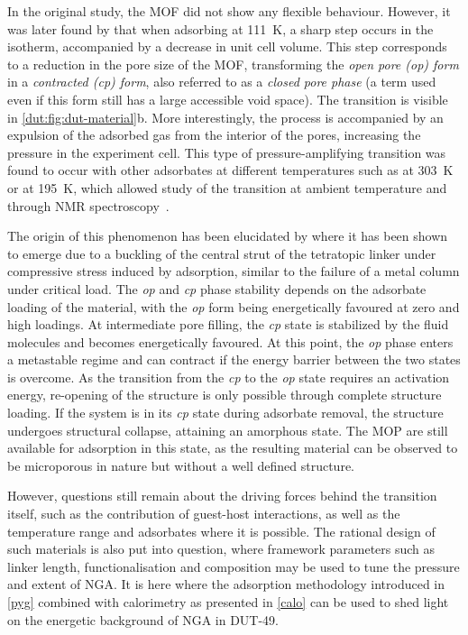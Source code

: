 In the original study, the \gls{MOF} did not show any flexible behaviour.
However, it was later found by 
\citet{krausePressureamplifyingFrameworkMaterial2016} that 
when adsorbing  at \SI{111}{\kelvin}, a sharp step occurs
in the isotherm, accompanied by a decrease in unit cell volume.
This step corresponds to a reduction in the pore size of the \gls{MOF},
transforming the \textit{open pore (op) form} in a \textit{contracted 
(cp) form}, also referred to as a \textit{closed pore phase}
(a term used even if this form still has a large accessible void space).
The transition is visible in \autoref{dut:fig:dut-material}b.
More interestingly, the process is accompanied by an expulsion of the
adsorbed gas from the interior of the pores, increasing the pressure
in the experiment cell. This type of pressure-amplifying transition
was found to occur with other adsorbates at different temperatures 
such as  at \SI{303}{\kelvin} or  at \SI{195}{\kelvin},
which allowed study of the transition at ambient temperature and through 
 \gls{NMR} spectroscopy~\cite{schaberSituMonitoringUnique2017}.

The origin of this phenomenon has been elucidated by 
\citet{evansOriginsNegativeGas2016} where it has been shown to 
emerge due to a buckling of the central strut of the 
tetratopic linker under compressive stress induced by adsorption,
similar to the failure of a metal column under critical load.
The \textit{op} and \textit{cp} phase stability depends on the 
adsorbate loading of the material, with the \textit{op} form
being energetically favoured at zero and high loadings. 
At intermediate pore filling, the \textit{cp} state is
stabilized by the fluid molecules and becomes energetically
favoured. At this point, the \textit{op} phase enters
a metastable regime and can contract if the energy barrier between the 
two states is overcome. As the transition from the \textit{cp} to the 
\textit{op} state requires an activation energy, re-opening of the 
structure is only possible through complete structure loading.
If the system is in its \textit{cp} state during adsorbate 
removal, the structure undergoes structural collapse, attaining 
an amorphous state. The \gls{MOP} are still available for adsorption
in this state, as the resulting material can be observed to 
be microporous in nature but without a well defined structure.

However, questions still remain about the driving forces
behind the transition itself, such as the contribution of 
guest-host interactions, as well as the temperature range 
and adsorbates where it is possible. The rational design 
of such materials is also put into question, where framework
parameters such as linker length, functionalisation and 
composition may be used to tune the pressure and extent of
\gls{NGA}. It is here where the adsorption methodology introduced
in \autoref{pyg} combined with calorimetry
as presented in \autoref{calo} can be used to shed light 
on the energetic background of \gls{NGA} in DUT-49.
